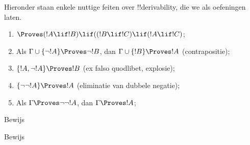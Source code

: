 \documentclass[../../../include/open-logic-section]{subfiles}
\begin{document}
Hieronder staan enkele nuttige feiten over !!{derivability}, die we als
oefeningen laten.

\begin{prop}
\begin{enumerate}
\item $\Proves (!A \lif !B) \lif ((!B \lif !C)
  \lif (!A \lif !C)$; 
\item Als $\Gamma \cup \{ \lnot !A\}
  \Proves \lnot !B$, dan $\Gamma \cup \{ !B\} \Proves
  !A$ (contrapositie); 
\item  $\{ !A, \lnot!A\} \Proves
    !B$ (ex falso quodlibet, explosie); 
\item  $\{ \lnot\lnot!A\} \Proves
  !A$ (eliminatie van dubbele negatie);
\item Als $\Gamma \Proves \lnot\lnot!A$, dan $\Gamma \Proves
  !A$;
\end{enumerate}
\end{prop}

\begin{prob}
  Bewijs 
\end{prob}
\tagendprob

\begin{prob}
  Bewijs 
\end{prob}
\tagendprob
\end{document}
